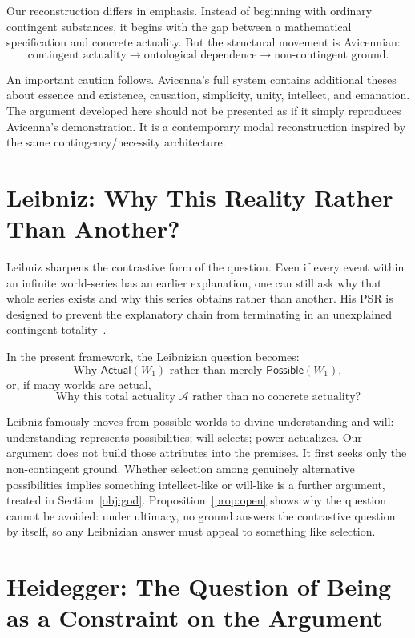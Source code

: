 \documentclass[11pt,letterpaper]{article}
\theoremstyle{plain}
\theoremstyle{definition}
\newcommand{\Actual}{\mathsf{Actual}}
\newcommand{\Possible}{\mathsf{Possible}}
\begin{document}
Our reconstruction differs in emphasis. Instead of beginning with ordinary contingent substances, it begins with the gap between a mathematical specification and concrete actuality. But the structural movement is Avicennian:
\[
  \text{contingent actuality} \longrightarrow \text{ontological dependence} \longrightarrow \text{non-contingent ground}.
\]

An important caution follows. Avicenna's full system contains additional theses about essence and existence, causation, simplicity, unity, intellect, and emanation. The argument developed here should not be presented as if it simply reproduces Avicenna's demonstration. It is a contemporary modal reconstruction inspired by the same contingency/necessity architecture.

\section{Leibniz: Why This Reality Rather Than Another?}
\label{sec:leibniz}

Leibniz sharpens the contrastive form of the question. Even if every event within an infinite world-series has an earlier explanation, one can still ask why that whole series exists and why this series obtains rather than another. His PSR is designed to prevent the explanatory chain from terminating in an unexplained contingent totality~\cite{leibniz,melamed}.

In the present framework, the Leibnizian question becomes:
\[
  \text{Why } \Actual(W_1) \text{ rather than merely } \Possible(W_1),
\]
or, if many worlds are actual,
\[
  \text{Why this total actuality } \mathcal{A} \text{ rather than no concrete actuality?}
\]

Leibniz famously moves from possible worlds to divine understanding and will: understanding represents possibilities; will selects; power actualizes. Our argument does not build those attributes into the premises. It first seeks only the non-contingent ground. Whether selection among genuinely alternative possibilities implies something intellect-like or will-like is a further argument, treated in Section~\ref{obj:god}. Proposition~\ref{prop:open} shows why the question cannot be avoided: under ultimacy, no ground answers the contrastive question by itself, so any Leibnizian answer must appeal to something like selection.

\section{Heidegger: The Question of Being as a Constraint on the Argument}
\end{document}
